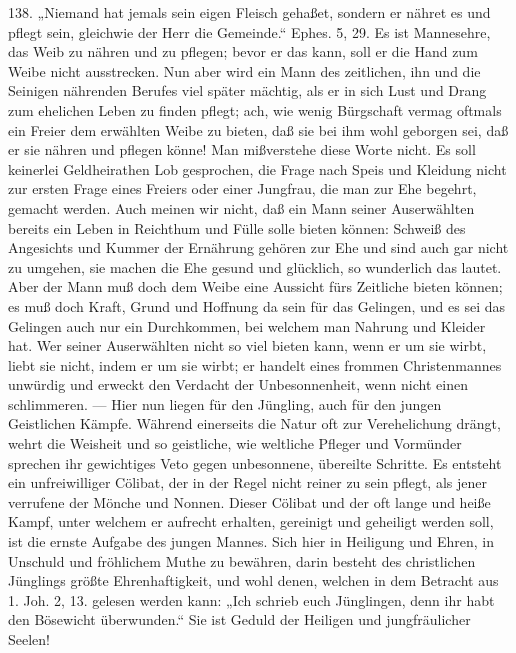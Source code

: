 138. „Niemand hat jemals sein eigen Fleisch gehaßet, sondern er nähret es und pflegt sein, gleichwie der Herr die Gemeinde.“ Ephes. 5, 29. Es ist Mannesehre, das Weib zu nähren und zu pflegen; bevor er das kann, soll er die Hand zum Weibe nicht ausstrecken. Nun aber wird ein Mann des zeitlichen, ihn und die Seinigen nährenden Berufes viel später mächtig, als er in sich Lust und Drang zum ehelichen Leben zu finden pflegt; ach, wie wenig Bürgschaft vermag oftmals ein Freier dem erwählten Weibe zu bieten, daß sie bei ihm wohl geborgen sei, daß er sie nähren und pflegen könne! Man mißverstehe diese Worte nicht. Es soll keinerlei Geldheirathen Lob gesprochen, die Frage nach Speis und Kleidung nicht zur ersten Frage eines Freiers oder einer Jungfrau, die man zur Ehe begehrt, gemacht werden. Auch meinen wir nicht, daß ein Mann seiner Auserwählten bereits ein Leben in Reichthum und Fülle solle bieten können: Schweiß des Angesichts und Kummer der Ernährung gehören zur Ehe und sind auch gar nicht zu umgehen, sie machen die Ehe gesund und glücklich, so wunderlich das lautet. Aber der Mann muß doch dem Weibe eine Aussicht fürs Zeitliche bieten können; es muß doch Kraft, Grund und Hoffnung da sein für das Gelingen, und es sei das Gelingen auch nur ein Durchkommen, bei welchem man Nahrung und Kleider hat. Wer seiner Auserwählten nicht so viel bieten kann, wenn er um sie wirbt, liebt sie nicht, indem er um sie wirbt;
er handelt eines frommen Christenmannes unwürdig und erweckt den Verdacht der Unbesonnenheit, wenn nicht einen schlimmeren. — Hier nun liegen für den Jüngling, auch für den jungen Geistlichen Kämpfe. Während einerseits die Natur oft zur Verehelichung drängt, wehrt die Weisheit und so geistliche, wie weltliche Pfleger und Vormünder sprechen ihr gewichtiges Veto gegen unbesonnene, übereilte Schritte. Es entsteht ein unfreiwilliger Cölibat, der in der Regel nicht reiner zu sein pflegt, als jener verrufene der Mönche und Nonnen. Dieser Cölibat und der oft lange und heiße Kampf, unter welchem er aufrecht erhalten, gereinigt und geheiligt werden soll, ist die ernste Aufgabe des jungen Mannes. Sich hier in Heiligung und Ehren, in Unschuld und fröhlichem Muthe zu bewähren, darin besteht des christlichen Jünglings größte Ehrenhaftigkeit, und wohl denen, welchen in dem Betracht aus 1. Joh. 2, 13. gelesen werden kann: „Ich schrieb euch Jünglingen, denn ihr habt den Bösewicht überwunden.“ Sie ist Geduld der Heiligen und jungfräulicher Seelen!

